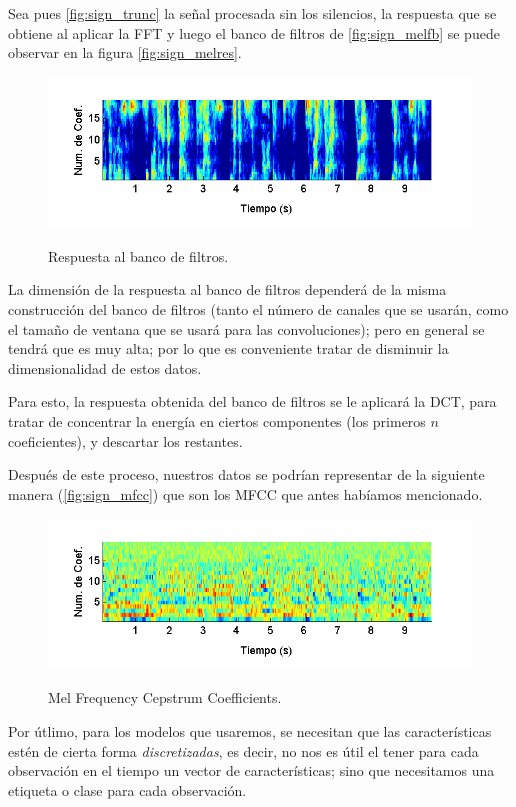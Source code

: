 Sea pues \autoref{fig:sign_trunc} la señal procesada sin los silencios, la respuesta que se obtiene al aplicar la \ac{FFT} y luego el banco de filtros de \autoref{fig:sign_melfb} se puede observar en la figura \autoref{fig:sign_melres}.
\begin{figure}[t]
  \myfloatalign
  {\includegraphics[width=0.9\linewidth]{gfx/chap2/signal-mel}} \quad
  \caption{Respuesta al banco de filtros.}
  \label{fig:sign_melres}
\end{figure}

La dimensión de la respuesta al banco de filtros dependerá de la misma construcción del banco de filtros (tanto el número de canales que se usarán, como el tamaño de ventana que se usará para las convoluciones); pero en general se tendrá que es muy alta; por lo que es conveniente tratar de disminuir la dimensionalidad de estos datos.

Para esto, la respuesta obtenida del banco de filtros se le aplicará la \ac{DCT}, para tratar de concentrar la energía en ciertos componentes (los primeros $n$ coeficientes), y descartar los restantes.

Después de este proceso, nuestros datos se podrían representar de la siguiente manera (\autoref{fig:sign_mfcc}) que son los \ac{MFCC} que antes habíamos mencionado.
\begin{figure}[t]
  \myfloatalign
  {\includegraphics[width=0.9\linewidth]{gfx/chap2/signal-mfcc}} \quad
  \caption{Mel Frequency Cepstrum Coefficients.}
  \label{fig:sign_mfcc}
\end{figure}

Por útlimo, para los modelos que usaremos, se necesitan que las características estén de cierta forma \textit{discretizadas}, es decir, no nos es útil el tener para cada observación en el tiempo un vector de características; sino que necesitamos una etiqueta o clase para cada observación. 

